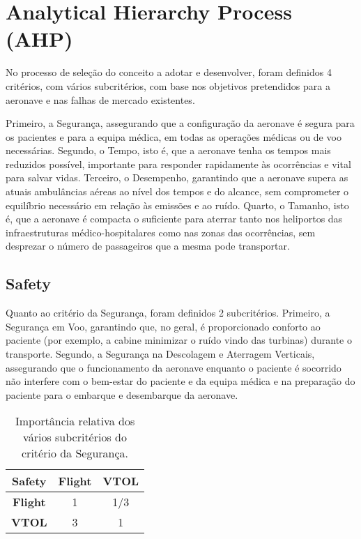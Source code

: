 \section{Analytical Hierarchy Process (AHP)}
\label{ahp}

No processo de seleção do conceito a adotar e desenvolver, foram definidos 4 critérios, com vários subcritérios, com base nos objetivos pretendidos para a aeronave e nas falhas de mercado existentes.

Primeiro, a Segurança, assegurando que a configuração da aeronave é segura para os pacientes e para a equipa médica, em todas as operações médicas ou de voo necessárias. Segundo, o Tempo, isto é, que a aeronave tenha os tempos mais reduzidos possível, importante para responder rapidamente às ocorrências e vital para salvar vidas. Terceiro, o Desempenho, garantindo que a aeronave supera as atuais ambulâncias aéreas ao nível dos tempos e do alcance, sem comprometer o equilíbrio necessário em relação às emissões e ao ruído. Quarto, o Tamanho, isto é, que a aeronave é compacta o suficiente para aterrar tanto nos heliportos das infraestruturas médico-hospitalares como nas zonas das ocorrências, sem desprezar o número de passageiros que a mesma pode transportar.


\subsection{Safety}


Quanto ao critério da Segurança, foram definidos 2 subcritérios. Primeiro, a Segurança em Voo, garantindo que, no geral, é proporcionado conforto ao paciente (por exemplo, a cabine minimizar o ruído vindo das turbinas) durante o transporte. Segundo, a Segurança na Descolagem e Aterragem Verticais, assegurando que o funcionamento da aeronave enquanto o paciente é socorrido não interfere com o bem-estar do paciente e da equipa médica e na preparação do paciente para o embarque e desembarque da aeronave.


\begin{table}[H]
\begin{center}
\caption{Importância relativa dos vários subcritérios do critério da Segurança.}
\begin{tabular}{ |c|c c| }
 \hline
 \textbf{Safety} & \textbf{Flight} & \textbf{VTOL}  \\
\hline
 \textbf{Flight} & 1 & 1/3  \\
 \textbf{VTOL} & 3 & 1   \\
\hline
\end{tabular}
\end{center}
\end{table}

